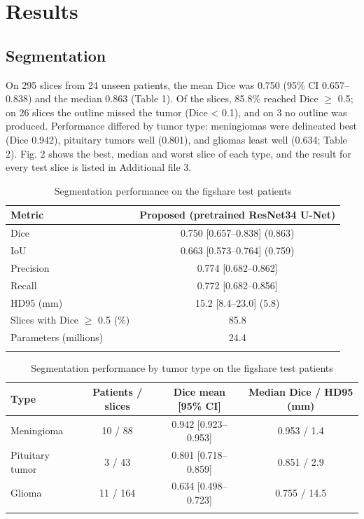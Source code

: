 \documentclass[pdflatex,sn-vancouver-num]{sn-jnl}
\begin{document}
\section{Results}\label{sec:results}

\subsection{Segmentation}

On 295 slices from 24 unseen patients, the mean Dice was 0.750 (95\% CI 0.657--0.838) and the median 0.863 (Table 1). Of the slices, 85.8\% reached Dice $\geq$ 0.5; on 26 slices the outline missed the tumor (Dice < 0.1), and on 3 no outline was produced. Performance differed by tumor type: meningiomas were delineated best (Dice 0.942), pituitary tumors well (0.801), and gliomas least well (0.634; Table 2). Fig. 2 shows the best, median and worst slice of each type, and the result for every test slice is listed in Additional file 3.

\begin{table}[!t]
\caption{Segmentation performance on the figshare test patients}\label{tab1}
\centering\footnotesize
\begin{tabular}{lc}
\toprule
Metric & Proposed (pretrained ResNet34 U-Net) \\
\midrule
Dice & 0.750 [0.657--0.838] (0.863) \\
IoU & 0.663 [0.573--0.764] (0.759) \\
Precision & 0.774 [0.682--0.862] \\
Recall & 0.772 [0.682--0.856] \\
HD95 (mm) & 15.2 [8.4--23.0] (5.8) \\
Slices with Dice $\geq$ 0.5 (\%) & 85.8 \\
Parameters (millions) & 24.4 \\
\botrule
\end{tabular}
\end{table}

\begin{table}[!t]
\caption{Segmentation performance by tumor type on the figshare test patients}\label{tab2}
\centering\footnotesize
\begin{tabular}{lccc}
\toprule
Type & Patients / slices & Dice mean [95\% CI] & Median Dice / HD95 (mm) \\
\midrule
Meningioma & 10 / 88 & 0.942 [0.923--0.953] & 0.953 / 1.4 \\
Pituitary tumor & 3 / 43 & 0.801 [0.718--0.859] & 0.851 / 2.9 \\
Glioma & 11 / 164 & 0.634 [0.498--0.723] & 0.755 / 14.5 \\
\botrule
\end{tabular}
\end{table}
\end{document}
